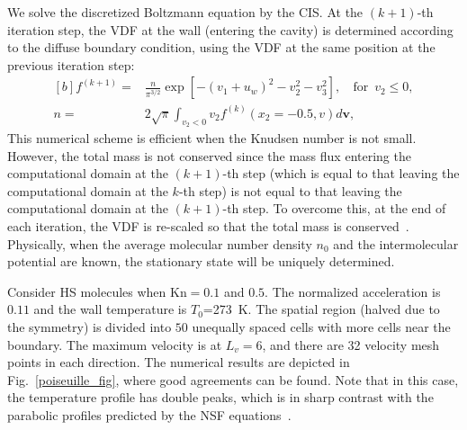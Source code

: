 We solve the discretized Boltzmann equation by the CIS. At the $(k+1)$-th iteration step, the VDF at the wall (entering the cavity) is determined according to the diffuse boundary condition, using the VDF at the same position at the previous iteration step:
\begin{equation}\label{wall_boundary}
\begin{aligned}[b]
{f}^{(k+1)}=&\frac{{n}}{{\pi}^{3/2}}\exp[-({v}_1+{u}_w)^2-{v}_2^2-{v}_3^2],
\ \ \ \operatorname{for} \ {v}_2\le0, \\
{n}=&2\sqrt{\pi}\int_{{v}_2<0}
{v}_2
{f}^{(k)}({x}_2=-0.5,{v})d\bm{v},
\end{aligned}
\end{equation}
This numerical scheme is efficient when the Knudsen number is not small. However, the total mass is not conserved since the mass flux entering the computational domain at the $(k+1)$-th step (which is equal to that leaving the computational domain at the $k$-th step) is not equal to that leaving the computational domain at the $(k+1)$-th step. To overcome this, at the end of each iteration, the VDF is re-scaled so that the total mass is conserved~\cite{Mieussens2004}. Physically, when the average molecular number density $n_0$ and the intermolecular potential are known, the stationary state will be uniquely determined. 



%

Consider HS molecules when $\text{Kn}=0.1$ and $0.5$. The normalized acceleration is $0.11$ and the wall temperature is $T_0$=273~K. The spatial region (halved due to the symmetry) is divided into $50$ unequally spaced cells with more cells near the boundary. The maximum velocity is at $L_v=6$, and there are 32 velocity mesh points in each direction. The numerical results are depicted in Fig.~\ref{poiseuille_fig}, where good agreements can be found. Note that in this case, the temperature profile has double peaks, which is in sharp contrast with the parabolic profiles predicted by the NSF equations~\cite{Zheng2002}. 

